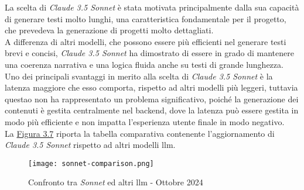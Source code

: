 \noindent La scelta di \textit{Claude 3.5 Sonnet} è stata motivata principalmente dalla sua capacità di generare testi molto lunghi, una caratteristica fondamentale per il progetto, che prevedeva la generazione di progetti molto dettagliati.\\
A differenza di altri modelli, che possono essere più efficienti nel generare testi brevi e concisi, \textit{Claude 3.5 Sonnet} ha dimostrato di essere in grado di mantenere una coerenza narrativa e una logica fluida anche su testi di grande lunghezza.\\

\noindent Uno dei principali svantaggi in merito alla scelta di \textit{Claude 3.5 Sonnet} è la latenza maggiore che esso comporta, rispetto ad altri modelli più leggeri,
tuttavia questao non ha rappresentato un problema significativo, poiché la generazione dei contenuti è gestita centralmente nel \gls{backend}, dove la latenza può essere gestita in modo più efficiente e non impatta l'esperienza utente finale in modo negativo.\\

\noindent La {\hyperref[fig:sonnet-comparison]{Figura 3.7}} riporta la tabella comparativa contenente l'aggiornamento di \textit{Claude 3.5 Sonnet} rispetto ad altri modelli \gls{llm}.

\begin{figure}[H]
    \centering
    \texttt{[image: sonnet-comparison.png]}
    \caption{Confronto tra \textit{Sonnet} ed altri \gls{llm} - Ottobre 2024}
    \cite{site:updated-sonnet}
    \label{fig:sonnet-comparison}
\end{figure}